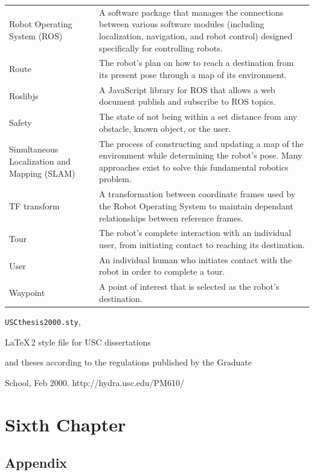 \documentclass[11pt]{report}
\begin{document}
\begin{longtable}{p{3cm}p{9.9cm}}
Robot Operating System (ROS)&A software package that manages the connections between various software modules (including localization, navigation, and robot control) designed specifically for controlling robots.\\
Route&The robot’s plan on how to reach a destination from its present pose through a map of its environment.\\
Roslibjs&A JavaScript library for ROS that allows a web document publish and subscribe to ROS topics.\\
Safety&The state of not being within a set distance from any obstacle, known object, or the user.\\
Simultaneous Localization and Mapping (SLAM)&The process of constructing and updating a map of the environment while determining the robot’s pose. Many approaches exist to solve this fundamental robotics problem.\\
TF transform&A transformation between coordinate frames used by the Robot Operating System to maintain dependant relationships between reference frames.\\
Tour&The robot’s complete interaction with an individual user, from initiating contact to reaching its destination.\\
User&An individual human who initiates contact with the robot in order to complete a tour.\\
Waypoint&A point of interest that is selected as the robot’s destination.
\end{longtable}



\begin{thebibliography}{99}

  \verb=USCthesis2000.sty=,

 \LaTeX\,2\raisebox{-0.2ex}{$\varepsilon$} style file for USC dissertations

 and theses according to the regulations published by the Graduate

 School, Feb 2000. http://hydra.usc.edu/PM610/

\end{thebibliography}

\newpage
\chapter{Sixth Chapter}
\section{Appendix}
\end{document}
